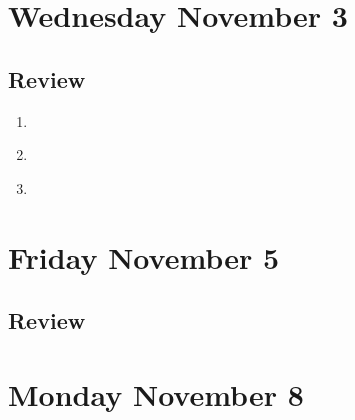 \documentclass[12pt, oneside]{article}
\begin{document}
\newpage
\section*{Wednesday November 3}


\newpage

\vfill

\newpage
\subsection*{Review}
\begin{enumerate}
\item \hspace{1in}\\ 
\item \hspace{1in}\\ 
\newpage
\item \hspace{1in}\\ 
\end{enumerate}

\newpage
\section*{Friday November 5}



\vspace{50pt}

\vspace{50pt}

\vspace{50pt}
\newpage

\newpage

\newpage
\subsection*{Review}



\section*{Monday November 8}
\end{document}
